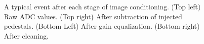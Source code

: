 \begin{figure}[p]
\centerline{}
\caption{\label{FIG::ANALYSIS::CONDITIONING} A typical event 
after each stage of image conditioning. (Top left) Raw ADC values. (Top
right) After subtraction of injected pedestals. (Bottom Left) After
gain equalization. (Bottom right) After cleaning.}
\end{figure}

